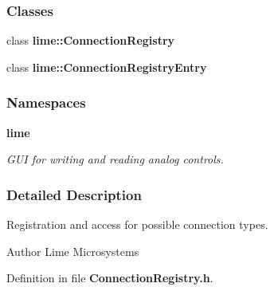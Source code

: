\subsubsection*{Classes}
\begin{DoxyCompactItemize}
\item 
class {\bf lime\+::\+Connection\+Registry}
\item 
class {\bf lime\+::\+Connection\+Registry\+Entry}
\end{DoxyCompactItemize}
\subsubsection*{Namespaces}
\begin{DoxyCompactItemize}
\item 
 {\bf lime}
\begin{DoxyCompactList}\small\item\em G\+UI for writing and reading analog controls. \end{DoxyCompactList}\end{DoxyCompactItemize}


\subsubsection{Detailed Description}
Registration and access for possible connection types. 

\begin{DoxyAuthor}{Author}
Lime Microsystems 
\end{DoxyAuthor}


Definition in file {\bf Connection\+Registry.\+h}.

